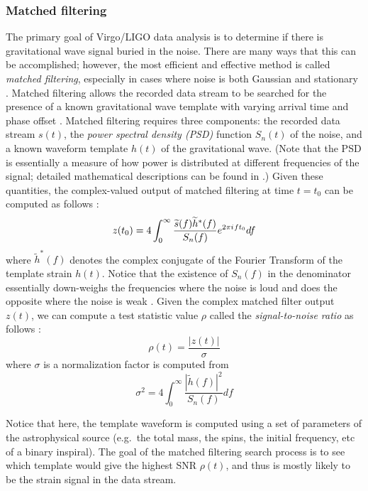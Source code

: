 \documentclass[preprint,
letterpaper,
 amsmath,amssymb,
 aps,
]{revtex4-2}
\newcommand{\iu}{{i\mkern1mu}}
\begin{document}
\subsubsection{Matched filtering}
The primary goal of Virgo/LIGO data analysis is to determine if there is gravitational wave signal buried in the noise. There are many ways that this can be accomplished; however, the most efficient and effective method is called \textit{matched filtering}, especially in cases where noise is both Gaussian and stationary \cite{helstrom_1975}. Matched filtering allows the recorded data stream to be searched for the presence of a known gravitational wave template with varying arrival time and phase offset \cite{surf}. Matched filtering requires three components: the recorded data stream $s(t)$, the \textit{power spectral density (PSD)} function $S_n(t)$ of the noise, and a known waveform template $h(t)$ of the gravitational wave. (Note that the PSD is essentially a measure of how power is distributed at different frequencies of the signal; detailed mathematical descriptions can be found in \cite{psd}.) Given these quantities, the complex-valued output of matched filtering at time $t=t_0$ can be computed as follows \cite{findchirp}:
\begin{equation}
    z(t_0) = 4\int_0^\infty\frac{\widetilde{s}(f)\widetilde{h}^*(f)}{S_n(f)}e^{2\pi\iu ft_0}df
\end{equation}
where $\widetilde{h}^*(f)$ denotes the complex conjugate of the Fourier Transform of the template strain $h(t)$. Notice that the existence of $S_n(f)$ in the denominator essentially down-weighs the frequencies where the noise is loud and does the opposite where the noise is weak \cite{ultimate}. Given the complex matched filter output $z(t)$, we can compute a test statistic value $\rho$ called the \textit{signal-to-noise ratio} as follows \cite{findchirp}: 
\begin{equation}
   \rho (t) = \frac{|z(t)|}{\sigma}
\end{equation}
where $\sigma$ is a normalization factor is computed from \cite{findchirp}
\begin{equation}
   \sigma^2 =  4\int_0^\infty\frac{|\widetilde{h}(f)|^2}{S_n(f)}df
\end{equation}

 Notice that here, the template waveform is computed using a set of parameters of the astrophysical source (e.g.\ the total mass, the spins, the initial frequency, etc of a binary inspiral). The goal of the matched filtering search process is to see which template would give the highest SNR $\rho (t)$, and thus is mostly likely to be the strain signal in the data stream. 
 
\end{document}
